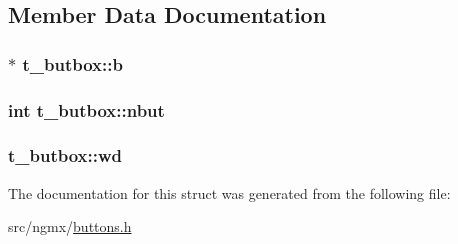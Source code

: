 \subsection{\-Member \-Data \-Documentation}
\hypertarget{structt__butbox_a9c7e6a0a4b8fcdab5db651edd79676d5}{
\subsubsection[{b}]{$\ast$ {\bf t\-\_\-butbox\-::b}}}\label{structt__butbox_a9c7e6a0a4b8fcdab5db651edd79676d5}
\hypertarget{structt__butbox_a040d93820736681a2d7d08e3d90defcd}{
\subsubsection[{nbut}]{\setlength{\rightskip}{0pt plus 5cm}int {\bf t\-\_\-butbox\-::nbut}}}\label{structt__butbox_a040d93820736681a2d7d08e3d90defcd}
\hypertarget{structt__butbox_a57b61cd17456fed375be08d7da00fa97}{
\subsubsection[{wd}]{ {\bf t\-\_\-butbox\-::wd}}}\label{structt__butbox_a57b61cd17456fed375be08d7da00fa97}


\-The documentation for this struct was generated from the following file\-:\begin{DoxyCompactItemize}
\item 
src/ngmx/\hyperlink{buttons_8h}{buttons.\-h}\end{DoxyCompactItemize}
